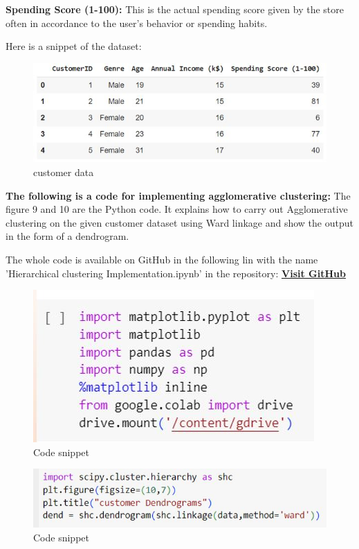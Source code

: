 \documentclass[conference]{IEEEtran}
\begin{document}
\textbf{Spending Score (1-100):} This is the actual spending score given by the store often in accordance to the user’s behavior or spending habits.

Here is a snippet of the dataset:
\begin{figure}
    \centering
    \includegraphics[width=0.8\linewidth]{customer segmentation.JPG}
    \caption{customer data}
    \label{fig:enter-label}
\end{figure}

\textbf{The following is a code for implementing agglomerative clustering:}
The figure 9 and 10 are the Python code. It explains how to carry out Agglomerative clustering on the given customer dataset using Ward linkage and show the output in the form of a dendrogram.

\noindent The whole code is available on GitHub in the following lin with the name 'Hierarchical clustering Implementation.ipynb' in the repository:
\href{https://github.com/hammadkaramat/Autonomous-lab-truck-platooning-/blob/main/Hierarchical%20clustering%20Implementation.ipynb}{\textbf{Visit GitHub}}


\begin{figure}
    \centering
    \includegraphics[width=0.7\linewidth]{code snip for customer segmentation.JPG}
    \caption{Code snippet }
    \label{fig:enter-label}
\end{figure}

\begin{figure}
    \centering
    \includegraphics[width=0.6\linewidth]{result snip for customer segmentation.JPG}
    \caption{Code snippet}
    \label{fig:enter-label}
\end{figure}
\end{document}
